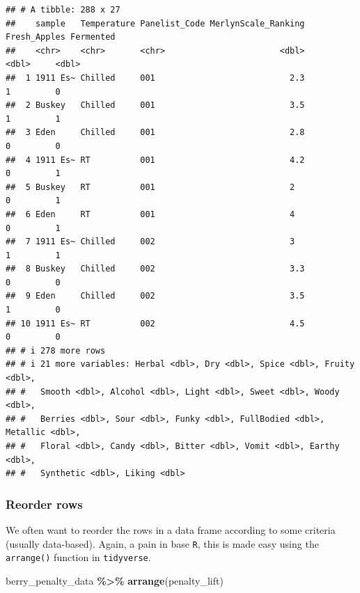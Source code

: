 \documentclass[
]{book}
\newenvironment{Shaded}{\begin{snugshade}}{\end{snugshade}}
\newcommand{\FunctionTok}[1]{\textcolor[rgb]{0.13,0.29,0.53}{\textbf{#1}}}
\newcommand{\NormalTok}[1]{#1}
\newcommand{\SpecialCharTok}[1]{\textcolor[rgb]{0.81,0.36,0.00}{\textbf{#1}}}
\begin{document}
\begin{verbatim}
## # A tibble: 288 x 27
##    sample   Temperature Panelist_Code MerlynScale_Ranking Fresh_Apples Fermented
##    <chr>    <chr>       <chr>                       <dbl>        <dbl>     <dbl>
##  1 1911 Es~ Chilled     001                           2.3            1         0
##  2 Buskey   Chilled     001                           3.5            1         1
##  3 Eden     Chilled     001                           2.8            0         0
##  4 1911 Es~ RT          001                           4.2            0         1
##  5 Buskey   RT          001                           2              0         1
##  6 Eden     RT          001                           4              0         1
##  7 1911 Es~ Chilled     002                           3              1         1
##  8 Buskey   Chilled     002                           3.3            0         0
##  9 Eden     Chilled     002                           3.5            1         0
## 10 1911 Es~ RT          002                           4.5            0         0
## # i 278 more rows
## # i 21 more variables: Herbal <dbl>, Dry <dbl>, Spice <dbl>, Fruity <dbl>,
## #   Smooth <dbl>, Alcohol <dbl>, Light <dbl>, Sweet <dbl>, Woody <dbl>,
## #   Berries <dbl>, Sour <dbl>, Funky <dbl>, FullBodied <dbl>, Metallic <dbl>,
## #   Floral <dbl>, Candy <dbl>, Bitter <dbl>, Vomit <dbl>, Earthy <dbl>,
## #   Synthetic <dbl>, Liking <dbl>
\end{verbatim}

\hypertarget{reorder-rows}{%
\subsubsection{Reorder rows}\label{reorder-rows}}

We often want to reorder the rows in a data frame according to some criteria (usually data-based). Again, a pain in base \texttt{R}, this is made easy using the \texttt{arrange()} function in \texttt{tidyverse}.

\begin{Shaded}
\begin{Highlighting}[]
\NormalTok{berry\_penalty\_data }\SpecialCharTok{\%\textgreater{}\%}
  \FunctionTok{arrange}\NormalTok{(penalty\_lift)}
\end{Highlighting}
\end{Shaded}
\end{document}
